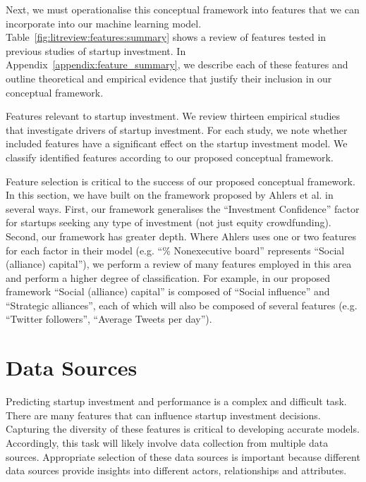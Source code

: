\documentclass[../thesis/thesis.tex]{subfiles}
\begin{document}
Next, we must operationalise this conceptual framework into features that we can incorporate into our machine learning model. Table~\ref{fig:litreview:features:summary} shows a review of features tested in previous studies of startup investment. In Appendix~\ref{appendix:feature_summary}, we describe each of these features and outline theoretical and empirical evidence that justify their inclusion in our conceptual framework.

\begin{table}[!htb]
    \centering
    \scalebox{1}{
        
    }
    \caption{Features relevant to startup investment. We review thirteen empirical studies that investigate drivers of startup investment. For each study, we note whether included features have a significant effect on the startup investment model. We classify identified features according to our proposed conceptual framework.}
    \label{fig:litreview:features:summary}
\end{table}

Feature selection is critical to the success of our proposed conceptual framework. In this section, we have built on the framework proposed by Ahlers et al. \cite{ahlers2015} in several ways. First, our framework generalises the ``Investment Confidence'' factor for startups seeking any type of investment (not just equity crowdfunding). Second, our framework has greater depth. Where Ahlers uses one or two features for each factor in their model (e.g. ``\% Nonexecutive board'' represents ``Social (alliance) capital''), we perform a review of many features employed in this area and perform a higher degree of classification. For example, in our proposed framework ``Social (alliance) capital'' is composed of ``Social influence'' and ``Strategic alliances'', each of which will also be composed of several features (e.g. ``Twitter followers'', ``Average Tweets per day'').

\section{Data Sources}

Predicting startup investment and performance is a complex and difficult task. There are many features that can influence startup investment decisions. Capturing the diversity of these features is critical to developing accurate models. Accordingly, this task will likely involve data collection from multiple data sources. Appropriate selection of these data sources is important because different data sources provide insights into different actors, relationships and attributes.
\end{document}
